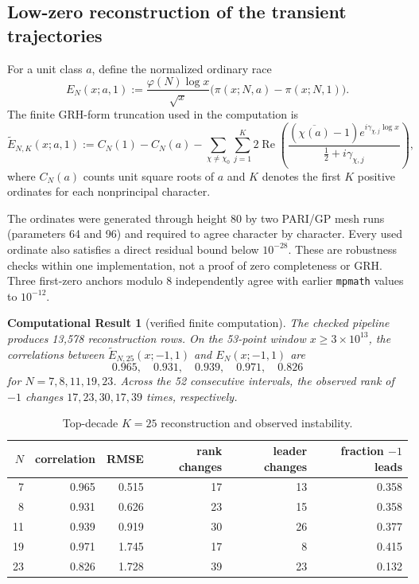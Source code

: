 \documentclass[12pt,reqno]{amsart}
\newtheorem{compresult}[theorem]{Computational Result}
\theoremstyle{definition}
\theoremstyle{remark}
\numberwithin{equation}{section}
\begin{document}
\subsection{Low-zero reconstruction of the transient trajectories}

For a unit class $a$, define the normalized ordinary race
\begin{equation}\label{eq:ordinary-normalization}
 E_N(x;a,1):=\frac{\varphi(N)\log x}{\sqrt{x}}
 \bigl(\pi(x;N,a)-\pi(x;N,1)\bigr).
\end{equation}
The finite GRH-form truncation used in the computation is
\begin{equation}\label{eq:ordinary-truncation}
 \widetilde E_{N,K}(x;a,1):=C_N(1)-C_N(a)
 -\sum_{\chi\ne\chi_0}\sum_{j=1}^K
 2\operatorname{Re}\!\left(
 \frac{(\overline{\chi(a)}-1)e^{i\gamma_{\chi,j}\log x}}
 {\tfrac12+i\gamma_{\chi,j}}\right),
\end{equation}
where $C_N(a)$ counts unit square roots of $a$ and $K$ denotes the first $K$
positive ordinates for each nonprincipal character.

The ordinates were generated through height 80 by two PARI/GP mesh runs
(parameters 64 and 96) and required to agree character by character.  Every
used ordinate also satisfies a direct residual bound below $10^{-28}$.  These
are robustness checks within one implementation, not a proof of zero
completeness or GRH.  Three first-zero anchors modulo 8 independently agree
with earlier \texttt{mpmath} values to $10^{-12}$.

\begin{compresult}[verified finite computation]\label{res:spectral-fit}
The checked pipeline produces 13,578 reconstruction rows.  On the 53-point
window $x\ge3\times10^{13}$, the correlations between
$\widetilde E_{N,25}(x;-1,1)$ and $E_N(x;-1,1)$ are
\[
0.965,\quad0.931,\quad0.939,\quad0.971,\quad0.826
\]
for $N=7,8,11,19,23$.  Across the 52 consecutive intervals, the observed rank
of $-1$ changes $17,23,30,17,39$ times, respectively.
\end{compresult}

\begin{table}[tb]
\centering
\small
\caption{Top-decade $K=25$ reconstruction and observed instability.}
\label{tab:spectral-fit}
\begin{tabular}{@{}rrrrrr@{}}
\toprule
$N$ & correlation & RMSE & rank changes & leader changes & fraction $-1$ leads\\
\midrule
7&0.965&0.515&17&13&0.358\\
8&0.931&0.626&23&15&0.358\\
11&0.939&0.919&30&26&0.377\\
19&0.971&1.745&17&8&0.415\\
23&0.826&1.728&39&23&0.132\\
\bottomrule
\end{tabular}
\end{table}
\end{document}
